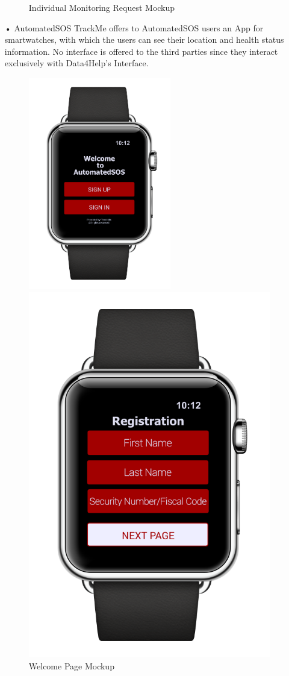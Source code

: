 \begin{enumerate}
\begin{figure}
\caption{Individual Monitoring Request Mockup}
\end{figure}
\newpage
\item[•]{\Large AutomatedSOS}
\bigbreak
\noindent
TrackMe offers to AutomatedSOS users an App for smartwatches, with which the users can see their location and health status information. No interface is offered to the third parties since they interact exclusively with Data4Help's Interface. 
\begin{figure}[H]
\begin{center}
        \begin{minipage}[c]{.40\textwidth}
        \centering
          \includegraphics[height=9.3cm]{Images/Mockups/AutomatedSOSMockup1.png}
	\caption{Welcome Page Mockup}
        \end{minipage}%
        \hspace{10mm}%
        \begin{minipage}[c]{.40\textwidth}
        \centering
          \includegraphics[height=9.3 cm]{Images/Mockups/AutomatedSOSMockup6.png}

\end{minipage}
\end{center}
\end{figure}
\end{enumerate}

